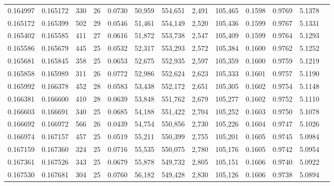 \begin{tabular}{rrrrrrrrrrrrr}
0.164997 & 0.165172 &   330 &  26 &                                     0.0730 &  50,959 & 554,651 &   2,491 & 105,465 & 0.1598 & 0.9769 & 5.1378 \\
0.165172 & 0.165399 &   502 &  29 &                                     0.0546 &  51,461 & 554,149 &   2,520 & 105,436 & 0.1599 & 0.9767 & 5.1331 \\
0.165402 & 0.165585 &   411 &  27 &                                     0.0616 &  51,872 & 553,738 &   2,547 & 105,409 & 0.1599 & 0.9764 & 5.1293 \\
0.165586 & 0.165679 &   445 &  25 &                                     0.0532 &  52,317 & 553,293 &   2,572 & 105,384 & 0.1600 & 0.9762 & 5.1252 \\
0.165681 & 0.165845 &   358 &  25 &                                     0.0653 &  52,675 & 552,935 &   2,597 & 105,359 & 0.1600 & 0.9759 & 5.1219 \\
0.165858 & 0.165989 &   311 &  26 &                                     0.0772 &  52,986 & 552,624 &   2,623 & 105,333 & 0.1601 & 0.9757 & 5.1190 \\
0.165992 & 0.166378 &   452 &  28 &                                     0.0583 &  53,438 & 552,172 &   2,651 & 105,305 & 0.1602 & 0.9754 & 5.1148 \\
0.166381 & 0.166600 &   410 &  28 &                                     0.0639 &  53,848 & 551,762 &   2,679 & 105,277 & 0.1602 & 0.9752 & 5.1110 \\
0.166603 & 0.166691 &   340 &  25 &                                     0.0685 &  54,188 & 551,422 &   2,704 & 105,252 & 0.1603 & 0.9750 & 5.1078 \\
0.166692 & 0.166972 &   566 &  26 &                                     0.0439 &  54,754 & 550,856 &   2,730 & 105,226 & 0.1604 & 0.9747 & 5.1026 \\
0.166974 & 0.167157 &   457 &  25 &                                     0.0519 &  55,211 & 550,399 &   2,755 & 105,201 & 0.1605 & 0.9745 & 5.0984 \\
0.167159 & 0.167360 &   324 &  25 &                                     0.0716 &  55,535 & 550,075 &   2,780 & 105,176 & 0.1605 & 0.9742 & 5.0954 \\
0.167361 & 0.167526 &   343 &  25 &                                     0.0679 &  55,878 & 549,732 &   2,805 & 105,151 & 0.1606 & 0.9740 & 5.0922 \\
0.167530 & 0.167681 &   304 &  25 &                                     0.0760 &  56,182 & 549,428 &   2,830 & 105,126 & 0.1606 & 0.9738 & 5.0894 \\

\end{tabular}
